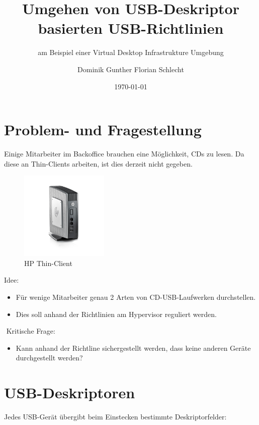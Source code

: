 \documentclass[]{beamer}
\title{Umgehen von USB-Deskriptor basierten USB-Richtlinien}
\subtitle{am Beispiel einer Virtual Desktop Infrastrukture Umgebung}
\date{\today}
\author{Dominik Gunther Florian Schlecht}
\institute[THI]{Technische Hochschule Ingolstadt}
\begin{document}
	\frame{\maketitle}
	\frame{\tableofcontents}
	
	\section{Problem- und Fragestellung}
	\begin{frame}{\secname}
		Einige Mitarbeiter im Backoffice brauchen eine Möglichkeit, CDs zu lesen. 
		\pause		
		Da diese an Thin-Clients arbeiten, ist dies derzeit nicht gegeben.
		\pause
		\begin{figure}[htbp]
			\centering
			\includegraphics[width=0.375\textwidth]{bilder/thinclient.jpg}
			\caption{HP Thin-Client}
			\label{fig:Thin-Client}
		\end{figure}
	\end{frame}
	
	\begin{frame}{\secname}
		Idee:
		\begin{itemize}
			\item Für wenige Mitarbeiter genau 2 Arten von CD-USB-Laufwerken durchstellen.
			\item Dies soll anhand der Richtlinien am Hypervisor reguliert werden.
		\end{itemize}
		\pause
		$ $\newline
		Kritische Frage:
		\begin{itemize}
			\item Kann anhand der Richtline sichergestellt werden, dass keine anderen Geräte durchgestellt werden?
		\end{itemize}
	\end{frame}
	
	\section{USB-Deskriptoren}
	\begin{frame}{\secname}
		Jedes USB-Gerät übergibt beim Einstecken bestimmte Deskriptorfelder:
		
	\end{frame}
	
\end{document}
